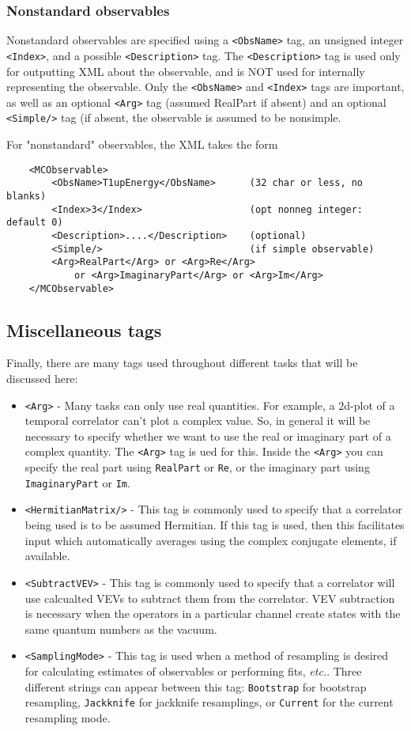 \documentclass[12pt,notitlepage,letterpaper]{article}
\newcommand{\vb}{\texttt}
\begin{document}
\subsubsection{Nonstandard observables} \label{sec:nonstandard_obs}

Nonstandard observables are specified using a \vb{<ObsName>} tag,
an unsigned integer \vb{<Index>}, and a possible \vb{<Description>}
tag. The \vb{<Description>} tag is used only for outputting
XML about the observable, and is NOT used for internally
representing the observable. Only the \vb{<ObsName>} and \vb{<Index>}
tags are important, as well as an optional \vb{<Arg>} tag
(assumed RealPart if absent) and an optional \vb{<Simple/>}
tag (if absent, the observable is assumed to be nonsimple.                  

For "nonstandard" observables, the XML takes the form
\begin{verbatim}
    <MCObservable>
        <ObsName>T1upEnergy</ObsName>      (32 char or less, no blanks)
        <Index>3</Index>                   (opt nonneg integer: default 0)
        <Description>....</Description>    (optional)
        <Simple/>                          (if simple observable)
        <Arg>RealPart</Arg> or <Arg>Re</Arg>
            or <Arg>ImaginaryPart</Arg> or <Arg>Im</Arg>
    </MCObservable>
\end{verbatim}

\subsection{Miscellaneous tags}

Finally, there are many tags used throughout different tasks that will
be discussed here:
\begin{itemize}
\item \vb{<Arg>} - Many tasks can only use real quantities. For example, a 2d-plot of a
temporal correlator can't plot a complex value. So, in general it will be necessary
to specify whether we want to use the real or imaginary part of a complex quantity.
The \vb{<Arg>} tag is ued for this. Inside the \vb{<Arg>} you can specify the real part
using \vb{RealPart} or \vb{Re}, or the imaginary part using \vb{ImaginaryPart}
or \vb{Im}.
\item \vb{<HermitianMatrix/>} - This tag is commonly used to specify that a correlator
being used is to be assumed Hermitian. If this tag is used, then this facilitates
input which automatically averages using the complex conjugate
elements, if available.
\item \vb{<SubtractVEV>} - This tag is commonly used to specify that a correlator
will use calcualted VEVs to subtract them from the correlator. VEV subtraction is
necessary when the operators in a particular channel create states with
the same quantum numbers as the vacuum.
\item \vb{<SamplingMode>} - This tag is used when a method of resampling is desired
for calculating estimates of observables or performing fits, \textit{etc.}.
Three different strings can appear between this tag: \vb{Bootstrap} for
bootstrap resampling, \vb{Jackknife} for jackknife resamplings, or \vb{Current}
for the current resampling mode. 
\end{itemize}
\end{document}
